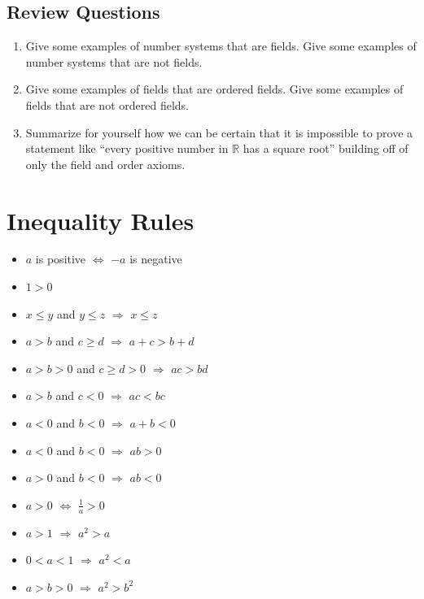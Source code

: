 \documentclass[
  letterpaper,
  DIV=11,
  numbers=noendperiod]{scrreprt}
\providecommand{\tightlist}{%
  \setlength{\itemsep}{0pt}\setlength{\parskip}{0pt}}
\def\R{\mathbb R}
\theoremstyle{plain}
\theoremstyle{definition}
\theoremstyle{plain}
\theoremstyle{plain}
\theoremstyle{definition}
\theoremstyle{definition}
\theoremstyle{remark}
\begin{document}
\subsection{Review Questions}\label{review-questions}

\begin{enumerate}
\def\labelenumi{\arabic{enumi}.}
\tightlist
\item
  Give some examples of number systems that are fields. Give some
  examples of number systems that are not fields.
\item
  Give some examples of fields that are ordered fields. Give some
  examples of fields that are not ordered fields.
\item
  Summarize for yourself how we can be certain that it is impossible to
  prove a statement like ``every positive number in \(\R\) has a square
  root'' building off of only the field and order axioms.
\end{enumerate}

\section{Inequality Rules}\label{sec-inequality-rules}

\begin{itemize}
\tightlist
\item
  \(a\) is positive \(\Leftrightarrow\) \(-a\) is negative
\item
  \(1>0\)
\item
  \(x\leq y\) and \(y\leq z\) \(\Rightarrow\) \(x\leq z\)
\item
  \(a>b\) and \(c\geq d\) \(\Rightarrow\) \(a+c>b+d\)
\item
  \(a>b>0\) and \(c\geq d>0\) \(\Rightarrow\) \(ac>bd\)
\item
  \(a>b\) and \(c<0\) \(\Rightarrow\) \(ac<bc\)
\item
  \(a<0\) and \(b<0\) \(\Rightarrow\) \(a+b<0\)
\item
  \(a<0\) and \(b<0\) \(\Rightarrow\) \(ab>0\)
\item
  \(a>0\) and \(b<0\) \(\Rightarrow\) \(ab<0\)
\item
  \(a>0\) \(\Leftrightarrow\) \(\frac{1}{a}>0\)
\item
  \(a>1\) \(\Rightarrow\) \(a^2>a\)
\item
  \(0<a<1\) \(\Rightarrow\) \(a^2<a\)
\item
  \(a>b>0\) \(\Rightarrow\) \(a^2>b^2\)
\end{itemize}
\end{document}
